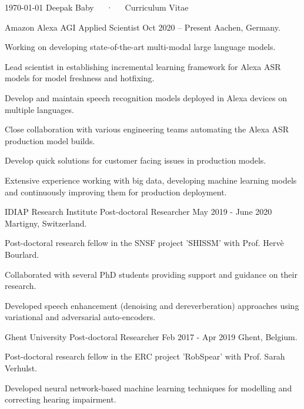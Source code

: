 \documentclass[]{awesome-cv}
\begin{document}
\makecvheader

\makecvfooter
  {\today}
  {Deepak Baby~~~·~~~Curriculum Vitae}
  {\thepage}

\begin{cventries}
	\cventry
	{Amazon Alexa AGI}
	{Applied Scientist}
	{Oct 2020 – Present}
	{Aachen, Germany.}
	{\begin{cvitems}
		\item {Working on developing state-of-the-art multi-modal large language models.}
		\item {Lead scientist in establishing incremental learning framework for Alexa ASR models for model freshness and hotfixing.}
		\item {Develop and maintain speech recognition models deployed in Alexa devices on multiple languages.}
		\item {Close collaboration with various engineering teams automating the Alexa ASR production model builds.}
		\item {Develop quick solutions for customer facing issues in production models.}
		\item {Extensive experience working with big data, developing machine learning models and continuously improving them for production deployment.}
		\end{cvitems}}
	\cventry
	{IDIAP Research Institute}
	{Post-doctoral Researcher}
	{May 2019 - June 2020}
	{Martigny, Switzerland.}
	{\begin{cvitems}
		\item{Post-doctoral research fellow in the SNSF project 'SHISSM' with Prof. Herv\`{e} Bourlard.}
		\item {Collaborated with several PhD students providing support and guidance on their research.}
		\item {Developed speech enhancement (denoising and dereverberation) approaches using variational and adversarial auto-encoders.}
		\end{cvitems}}
	\cventry
	{Ghent University}
	{Post-doctoral Researcher}
	{Feb 2017 - Apr 2019}
	{Ghent, Belgium.}
	{\begin{cvitems}
		\item {Post-doctoral research fellow in the ERC project 'RobSpear' with Prof. Sarah Verhulst.}
		\item {Developed neural network-based machine learning techniques for modelling and correcting hearing impairment.}

\end{cvitems}}
\end{cventries}
\end{document}
